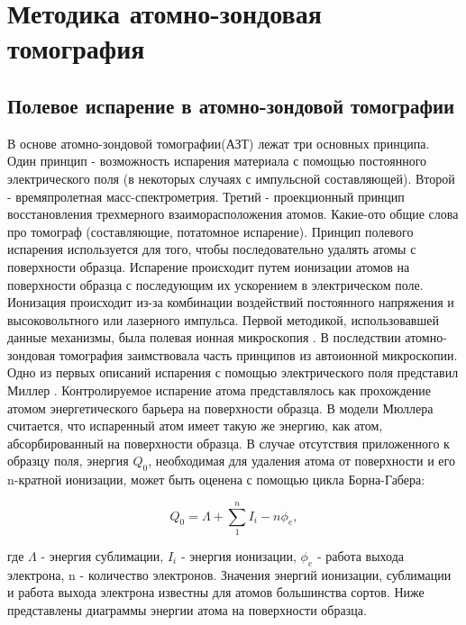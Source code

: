 \chapter{Методика атомно-зондовая томография}\label{ch:ch1}



\section{Полевое испарение в атомно-зондовой томографии}\label{sec:ch1/sec1}

В основе атомно-зондовой томографии(АЗТ) лежат три основных принципа. Один принцип - возможность испарения материала с помощью постоянного электрического поля (в некоторых случаях с импульсной составляющей). Второй - времяпролетная масс-спектрометрия. Третий - проекционный принцип восстановления трехмерного взаиморасположения атомов. Какие-ото общие слова про томограф (составляющие, потатомное испарение). Принцип полевого испарения используется для того, чтобы последовательно удалять атомы с поверхности образца. Испарение происходит путем ионизации атомов на поверхности образца с последующим их ускорением в электрическом поле. Ионизация происходит из-за комбинации воздействий постоянного напряжения и высоковольтного или лазерного импульса. Первой методикой, использовавшей данные механизмы, была полевая ионная микроскопия \cite{Muller60}. В последствии атомно-зондовая томография заимствовала часть принципов из автоионной микроскопии.
Одно из первых описаний испарения с помощью электрического поля представил Миллер \cite{Muller56}. Контролируемое испарение атома представлялось как прохождение атомом энергетического барьера на поверхности образца. В модели Мюллера считается, что испаренный атом имеет такую же энергию, как атом, абсорбированный на поверхности образца. В случае отсутствия приложенного к образцу поля, энергия $Q_0$, необходимая для удаления атома от поверхности и его n-кратной ионизации, может быть оценена с помощью цикла Борна-Габера:

\begin{equation}
	\label{eq:equation1}
	Q_0 = \Lambda + \sum_{1}^{n} I_i -n\phi_e,
\end{equation}

где $\Lambda$ - энергия сублимации, $I_i$ - энергия ионизации, $\phi_e$ - работа выхода электрона, n - количество электронов. Значения энергий ионизации, сублимации и работа выхода электрона известны для атомов большинства сортов. Ниже представлены диаграммы энергии атома на поверхности образца.

